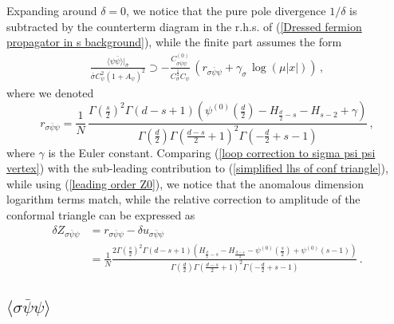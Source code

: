 \documentclass[aps,amsmath,amssymb,prd,showpacs,floatfix,preprint,superscriptaddress,nofootinbib,12pt]{article}
\begin{document}
Expanding around $\delta = 0$, we notice that the pure pole divergence $1/\delta$
is subtracted by the counterterm diagram in the r.h.s. of (\ref{Dressed fermion propagator in s background}),
while the finite part assumes the form
\begin{align}
\label{loop correction to sigma psi psi vertex}
\frac{\langle\psi\bar\psi\rangle|_{\bar\sigma}}{\bar\sigma C_\psi^2(1{+}A_\psi)^2}\supset
-\frac{C_{\sigma\bar\psi\psi}^{(0)}}{C_\sigma^\frac{1}{2}C_\psi}\,\left(
r_{\sigma\bar\psi\psi}+\gamma_\sigma\,\log(\mu |x|)\right)\,,
\end{align}
where we denoted
\begin{equation}
r_{\sigma\bar\psi\psi}=\frac{1}{N}\,
\frac{\Gamma \left(\frac{s}{2}\right)^2 \Gamma (d-s+1) \left(\psi ^{(0)}\left(\frac{d}{2}\right)-H_{\frac{d}{2}-s}-H_{s-2}+\gamma \right)}{ \Gamma \left(\frac{d}{2}\right) \Gamma \left(\frac{d-s}{2} +1\right)^2 \Gamma \left(-\frac{d}{2}+s-1\right)}\,,
\end{equation}
where $\gamma$ is the Euler constant.
Comparing (\ref{loop correction to sigma psi psi vertex}) with the sub-leading contribution to
(\ref{simplified lhs of conf triangle}), while using (\ref{leading order Z0}), we notice that the anomalous
dimension logarithm terms match, while the relative correction to amplitude of the conformal
triangle can be expressed as
\begin{equation}
\begin{aligned}
\delta Z_{\sigma\bar\psi\psi} &= r_{\sigma\bar\psi\psi} - \delta u_{\sigma\bar\psi\psi}\\
&=\frac{1}{N}
\frac{2 \Gamma \left(\frac{s}{2}\right)^2 \Gamma (d-s+1) \left(H_{\frac{d}{2}-s}-H_{\frac{d-s}{2}}-\psi ^{(0)}\left(\frac{s}{2}\right)+\psi ^{(0)}(s-1)\right)}{\Gamma \left(\frac{d}{2}\right) \Gamma \left(\frac{d-s}{2} +1\right)^2 \Gamma \left(-\frac{d}{2}+s-1\right)}\,.
\end{aligned}
\end{equation}



\subsection{$\langle\sigma\bar\psi\psi\rangle$}
\label{sec: GN sigma psi psi}
\end{document}
